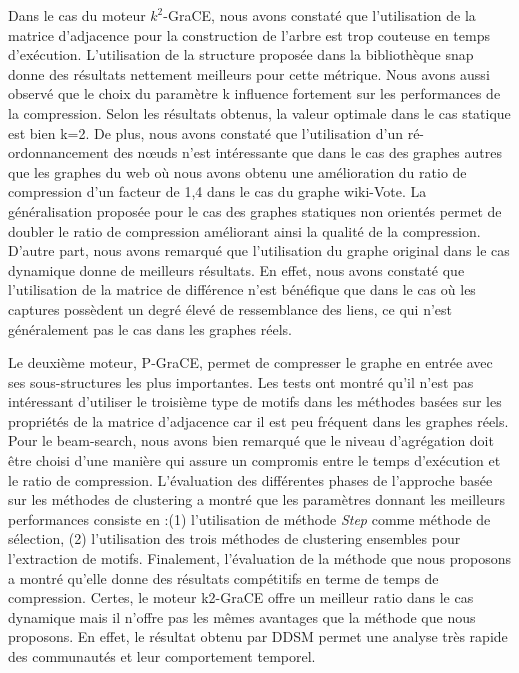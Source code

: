 	Dans le cas du moteur $k^2$-GraCE, nous avons constaté que l'utilisation de la matrice d'adjacence pour la construction de l'arbre est trop couteuse en temps d'exécution. L'utilisation de la structure proposée dans la bibliothèque \gls{snap} donne des résultats nettement meilleurs pour cette métrique. Nous avons aussi observé que le choix du paramètre k influence fortement sur les performances de la compression. Selon les résultats obtenus, la valeur optimale dans le cas statique est bien k=2. De plus, nous avons constaté que l'utilisation d'un ré-ordonnancement des nœuds n'est intéressante que dans le cas des graphes autres que les graphes du web où nous avons obtenu une amélioration du ratio de compression d'un facteur de 1,4 dans le cas du graphe wiki-Vote. La généralisation  proposée pour le cas des graphes statiques non orientés permet de doubler le ratio de compression améliorant ainsi la qualité de la compression. D'autre part, nous avons remarqué que l'utilisation du graphe original dans le cas dynamique donne de meilleurs résultats. En effet, nous avons constaté que l'utilisation de la matrice de différence n'est bénéfique que dans le cas où les captures possèdent un degré élevé de ressemblance des liens, ce qui n'est généralement pas le cas dans les graphes réels.
	
	Le deuxième moteur, P-GraCE, permet de compresser le graphe en entrée avec ses sous-structures les plus importantes. Les tests ont montré qu'il n'est pas intéressant d'utiliser le troisième type de motifs dans les méthodes basées sur les propriétés de la matrice d'adjacence car il est peu fréquent dans les graphes réels. Pour le beam-search, nous avons bien remarqué que le niveau d'agrégation doit être choisi d'une manière qui assure un compromis entre le temps d'exécution et le ratio de compression. L'évaluation des différentes phases de  l'approche basée sur les méthodes de clustering a montré que les paramètres donnant les meilleurs performances consiste en :(1) l'utilisation de méthode \textit{Step} comme méthode de sélection, (2) l'utilisation des trois méthodes de clustering ensembles pour l'extraction de motifs. Finalement, l'évaluation de la méthode que nous proposons a montré qu'elle donne des résultats compétitifs en terme de temps de compression. Certes, le moteur k2-GraCE offre un meilleur ratio dans le cas dynamique mais il n'offre pas les mêmes avantages que la méthode que nous proposons. En effet, le résultat obtenu par DDSM permet une analyse très rapide des communautés et leur comportement temporel.
	
